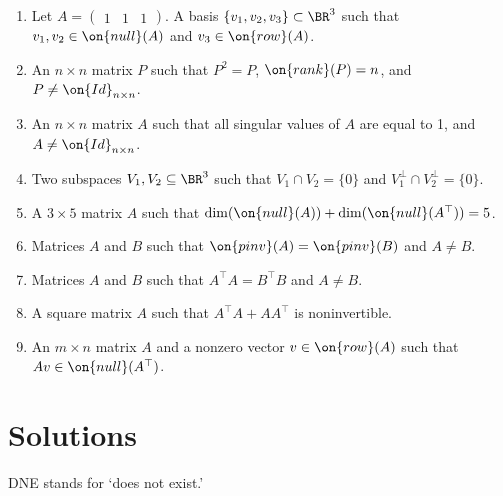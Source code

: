 \documentclass[10pt]{amsart}
\theoremstyle{mythm}
\theoremstyle{definition}
\theoremstyle{myrmk}
\newcounter{part-count}
\newenvironment{me}[1]{\begin{enumerate}[#1]\setcounter{enumi}{\value{part-count}}}{\setcounter{part-count}{\value{enumi}}\end{enumerate}}
\begin{document}
\begin{me}{itemsep = 0.2cm}
		\item Let $A = \begin{pmatrix}
		1 & 1 & 1
		\end{pmatrix}$. A basis $\{v_1, v_2, v_3\} \subset \BR^3$ such that $v_1, v_2 \in \on{null}(A)$ and $v_3 \in \on{row}(A)$.  
		\item An $n \times n$ matrix $P$ such that $P^2 = P$, $\on{rank}(P) = n$, and $P \neq \on{Id}_{n \times n}$. 
		\item An $n \times n$ matrix $A$ such that all singular values of $A$ are equal to 1, and $A \neq \on{Id}_{n \times n}$. 
		\item Two subspaces $V_1, V_2 \subseteq \BR^3$ such that $V_1 \cap V_2 = \{0\}$ and $V_1^\perp \cap V_2^\perp = \{0\}$. 
		\item A $3 \times 5$ matrix $A$ such that $\dim(\on{null}(A)) + \dim(\on{null}(A^\top)) = 5$. 
		\item Matrices $A$ and $B$ such that $\on{pinv}(A) = \on{pinv}(B)$ and $A \neq B$. 
		\item Matrices $A$ and $B$ such that $A^\top A = B^\top B$ and $A \neq B$. 
		\item A square matrix $A$ such that $A^\top A + AA^\top$ is noninvertible. 
		\item An $m \times n$ matrix $A$ and a nonzero vector $v \in \on{row}(A)$ such that $Av \in \on{null}(A^\top)$. 
	\end{me}
	
	\newpage
	
	\section*{Solutions} 
	
	\noindent DNE stands for `does not exist.' 
	
\end{document}
